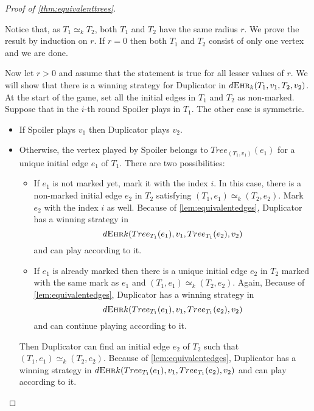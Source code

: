 \documentclass[12pt,notitlepage,a4paper]{article}
\theoremstyle{definition}
\newcommand{\morph}[1]{\simeq_#1}
\newcommand{\ehr}{\textsc{Ehr}}
\begin{document}
\begin{proof}[Proof of \cref{thm:equivalenttrees}]~ \par
	Notice that, as $T_1\morph{k} T_2$, both $T_1$ and
	$T_2$ have the same radius $r$.
	We prove the result by induction on $r$.
	If $r=0$ then both $T_1$ and $T_2$ consist
	of only one vertex and we are done. \par
	Now let $r>0$ and assume that the 
	statement is true for all lesser values of $r$.
	We will show that there is a winning strategy 
	for Duplicator in
	$d\ehr_k(T_1,v_1,T_2,v_2)$.
	At the start of the game, set all the initial edges
	in $T_1$ and $T_2$ as non-marked. 
	Suppose that in the $i$-th round Spoiler plays in 
	$T_1$. The other case is symmetric. 
	\begin{itemize}
		\item If Spoiler plays $v_1$ then Duplicator plays $v_2$.
		\item Otherwise, the vertex played by Spoiler belongs to
		$Tree_{(T_1,v_1)}(e_1)$
		for a unique initial edge $e_1$ of $T_1$. 
		There are two possibilities:
		\begin{itemize}
			\item If $e_1$ is not marked yet, mark it with
			the index $i$. In this case, there is a 
			non-marked initial
			edge $e_2$ in $T_2$ satisfying 
			$(T_1,e_1)\simeq_k (T_2,e_2)$.
			Mark $e_2$ with the index $i$ as well. 
			Because of
			\cref{lem:equivalentedges}, Duplicator
			has a winning strategy in
			\[d\ehr{k}(Tree_{T_1}(e_1), v_1, 
			Tree_{T_1}(e_2),v_2)\] and can play according to it.
			\item If $e_1$ is already marked then there is
			a unique initial edge $e_2$ in $T_2$ marked with 
			the same mark as $e_1$ and 	
			$(T_1,e_1)\simeq_k (T_2,e_2)$. Again, 
			Because of
			\cref{lem:equivalentedges}, Duplicator
			has a winning strategy in
			\[d\ehr{k}(Tree_{T_1}(e_1), v_1, 
			Tree_{T_1}(e_2),v_2)\] and can
			continue playing 
			according to it.
			
			
		\end{itemize}
		Then Duplicator can find an initial 
		edge $e_2$ of $T_2$ such that
		$(T_1,e_1)\simeq_k (T_2,e_2)$.
		Because of
		\cref{lem:equivalentedges}, Duplicator
		has a winning strategy in
		$d\ehr{k}(Tree_{T_1}(e_1), v_1, 
		Tree_{T_1}(e_2),v_2) $ and can play according to it.
	\end{itemize}
	
	
\end{proof}
\end{document}
